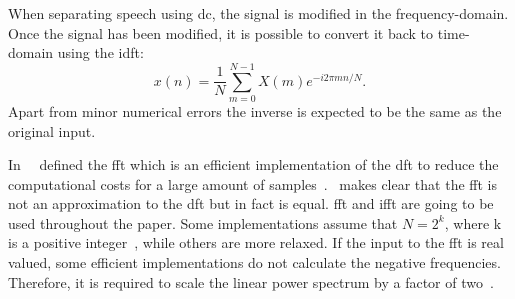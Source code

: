 When separating speech using \gls{dc}, the signal is modified in the frequency-domain. Once the signal has been modified, it is possible to convert it back to time-domain using the \gls{idft}:
\begin{equation}
	x(n) = \frac{1}{N}\sum_{m=0}^{N-1} X(m)e^{-i2\pi m n / N}.
	\label{eq.idft}
\end{equation}
Apart from minor numerical errors the inverse is expected to be the same as the original input.

In~\citeyear{Cooley1965}~\textcite{Cooley1965} defined the \gls{fft} which is an efficient implementation of the \gls{dft} to reduce the computational costs for a large amount of samples~\cite[p.~129]{Lyons1997}.~\textcite[p.~131]{Lyons1997} makes clear that the \gls{fft} is not an approximation to the \gls{dft} but in fact is equal. \gls{fft} and \gls{ifft} are going to be used throughout the paper.
Some implementations assume that $N=2^k$, where k is a positive integer~\cite[p.~130]{Lyons1997}, while others are more relaxed.
If the input to the \gls{fft} is real valued, some efficient implementations do not calculate the negative frequencies. Therefore, it is required to scale the linear power spectrum by a factor of two~\cite[p.~15]{Heinzel2002}.

